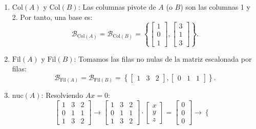 \begin{enumerate}[label=\color{red}\textbf{\arabic*)}]
\begin{enumerate}[label=Paso \arabic*:]
                 \begin{enumerate}[label=\arabic*)]
                    \item $\mathrm{Col}(A)$ y $\mathrm{Col}(B)$: Las columnas pivote de $A$  (o $B$) son las columnas 1 y 2. Por tanto, una base es: \[
                    \mathcal{B}_{\mathrm{Col}(A)}=\mathcal{B}_{\mathrm{Col}(B)}=\left\{ \begin{bmatrix} 
                    1\\ 0\\ 1 
                    \end{bmatrix},\begin{bmatrix} 
                    3\\ 1\\ 3 
                    \end{bmatrix}   \right\} .
                    \] 
                \item $\mathrm{Fil}(A)$ y $\mathrm{Fil}(B)$: Tomamos las filas no nulas de la matriz escalonada por filas: \[
                \mathcal{B}_{\mathrm{Fil}(A)}=\mathcal{B}_{\mathrm{Fil}(B)}=\left\{\begin{bmatrix} 
                        1 & 3 & 2 
                \end{bmatrix},\begin{bmatrix} 
                        0 & 1 & 1 
                \end{bmatrix}  \right\} .
                \] 
            \item $\mathrm{nuc}(A)$: Resolviendo $Ax=0$:  \[
            \begin{bmatrix} 
                1 & 3 & 2\\
                0 & 1 & 1\\
                1 & 3 & 2
            \end{bmatrix}\to \begin{bmatrix} 
                1 & 3 & 2\\
                0 & 1 & 1\\
                1 & 3 & 2
            \end{bmatrix}\cdot \begin{bmatrix} 
            x\\ y\\ z 
            \end{bmatrix}=\begin{bmatrix} 
            0\\ 0\\ 0 
            \end{bmatrix} \longrightarrow \begin{cases}

\end{cases}\]
\end{enumerate}
\end{enumerate}
\end{enumerate}
